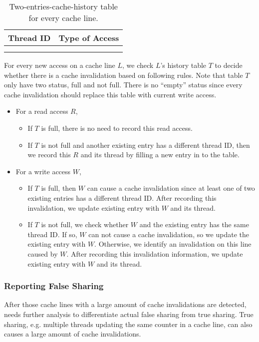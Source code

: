 \begin{table}
\centering
  \begin{tabular}{ l | r }
    \hline
    {Thread ID} & {Type of Access} \\ \hline
    \hline
     &   \\ \hline
     &   \\ \hline
  \end{tabular}
  \caption{Two-entries-cache-history table for every cache line. \label{table:cachehistory}}
\end{table} 


For every new access on a cache line $L$, we check $L$'s history table
$T$ to decide whether there is a cache invalidation based on following rules.
Note that table $T$ only have two status, full and not full. 
There is no ``empty'' status since every cache invalidation should 
replace this table with current write access.

\begin{itemize}
\item
  For a read access $R$, 
  \begin{itemize}
    \item
      If $T$ is full, there is no need to record this read access.
    \item
      If $T$ is not full and another existing entry has a different thread
      ID, then we record this $R$ and its thread by filling a new entry in to the table. 
  \end{itemize}
\item
  For a write access $W$, 
  \begin{itemize}
    \item
      If $T$ is full, then $W$ can cause a cache invalidation since at least 
      one of two existing entries has a different thread ID.
      After recording this invalidation, we update 
      existing entry with $W$ and its thread.
    \item
      If $T$ is not full,
      we check whether $W$ and the existing entry has the same thread ID. If
      so, $W$ can not cause a cache invalidation, so we update the existing
      entry with $W$. Otherwise, we identify an invalidation on this line caused by $W$. 
      After recording this invalidation information, we update 
      existing entry with $W$ and its thread.
  \end{itemize}
\end{itemize}

\subsubsection{Reporting False Sharing}
After those cache lines with a large amount of cache invalidations are detected,
\Predator{} needs further analysis to differentiate actual false sharing from true sharing. 
True sharing, e.g. multiple threads updating 
the same counter in a cache line, can also causes a large amount of cache invalidations.

